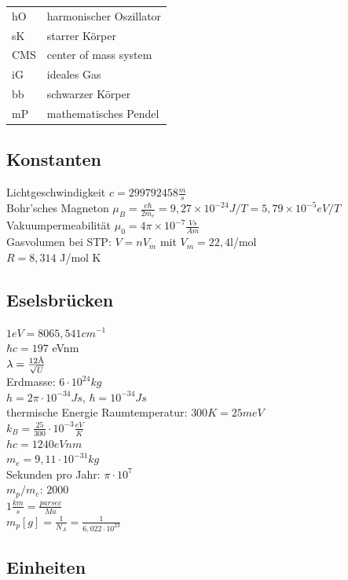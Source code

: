 \documentclass[12pt,a4paper]{article}
\renewcommand{\=}[1]{\stackrel{#1}{=}}
\theoremstyle{definition}
\theoremstyle{remark}
\begin{document}
\begin{tabular}{ll}
hO & harmonischer Oszillator\\
sK & starrer Körper\\
CMS & center of mass system\\
iG & ideales Gas\\
bb & schwarzer Körper\\
mP & mathematisches Pendel\\

\end{tabular}

\subsection{Konstanten}
Lichtgeschwindigkeit \dotfill $c = 299 792 458 \frac{m}{s}$\\
Bohr'sches Magneton \dotfill $\mu_B = \frac{e\hbar}{2m_e} = 9,27 \times 10^{-24} J/T = 5,79 \times 10^{-5} eV/T$\\
Vakuumpermeabilität \dotfill $\mu_0 = 4\pi \times 10^{-7} \frac{Vs}{Am}$\\
Gasvolumen bei STP: $V = n V_m$ mit $V_m = 22,4$l/mol\\
$R = 8,314$ J/mol K


\subsection{Eselsbrücken}

$1eV = 8065,541 cm^{-1}$\\
$\hbar c = 197$ eVnm\\
$\lambda = \frac{12{\text \AA}}{\sqrt{U}}$\\
Erdmasse: $6 \cdot 10^{24} kg$\\
$h = 2 \pi \cdot 10^{-34} Js$, $\hbar = 10^{-34} Js$\\
thermische Energie Raumtemperatur: $300K = 25meV$\\
$k_B = \frac{25}{300} \cdot 10^{-3} \frac{eV}{K}$\\
$hc = 1240 eVnm$\\
$m_e = 9,11 \cdot 10^{-31}kg$\\
Sekunden pro Jahr: $\pi \cdot 10^7$\\
$m_p / m_e$: $2000$\\
$1 \frac{km}{s}  = \frac{parsec}{Ma}$\\
$m_p[g] = \frac{1}{N_A} = \frac{1}{6,022 \cdot 10^{23}}$


\subsection{Einheiten}
\end{document}
